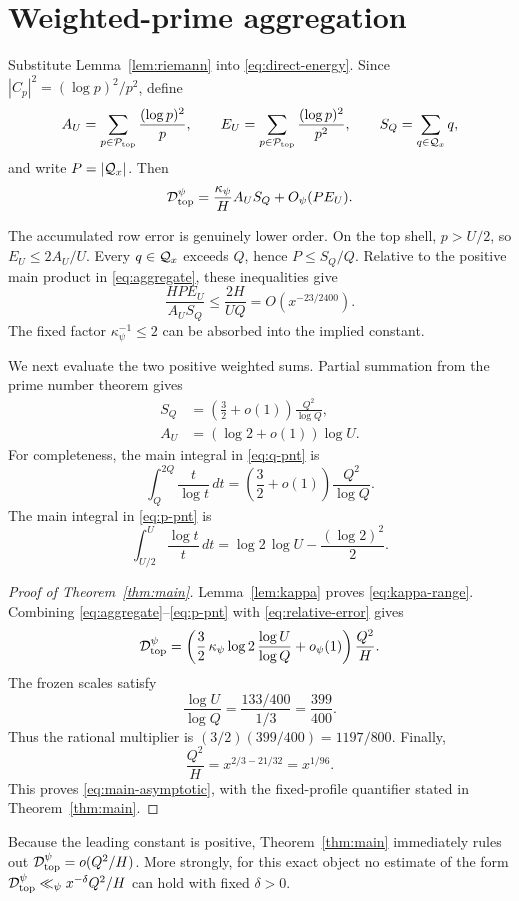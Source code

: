 \section{Weighted-prime aggregation}
\label{sec:aggregation}

Substitute Lemma~\ref{lem:riemann} into \eqref{eq:direct-energy}.  Since
$|C_p|^2=(\log p)^2/p^2$, define
\[
 A_U=\sum_{p\in\mathcal{P}_{\mathrm{top}}}\frac{(\log p)^2}{p},\qquad
 E_U=\sum_{p\in\mathcal{P}_{\mathrm{top}}}\frac{(\log p)^2}{p^2},\qquad
 S_Q=\sum_{q\in\mathcal{Q}_x}q,
\]
and write $P=|\mathcal{Q}_x|$.  Then
\begin{equation}
 \mathcal{D}_{\mathrm{top}}^{\psi}=\frac{\kappa_\psi}{H}A_US_Q+O_\psi(PE_U).
 \label{eq:aggregate}
\end{equation}

The accumulated row error is genuinely lower order.  On the top shell,
$p>U/2$, so $E_U\leq2A_U/U$.  Every $q\in\mathcal{Q}_x$ exceeds $Q$, hence
$P\leq S_Q/Q$.  Relative to the positive main product in
\eqref{eq:aggregate}, these inequalities give
\begin{equation}
 \frac{HPE_U}{A_US_Q}
 \leq\frac{2H}{UQ}
 =O\!\left(x^{-23/2400}\right).
 \label{eq:relative-error}
\end{equation}
The fixed factor $\kappa_\psi^{-1}\leq2$ can be absorbed into the implied
constant.

We next evaluate the two positive weighted sums.  Partial summation from the
prime number theorem gives \cite{MontgomeryVaughan2007}
\begin{align}
 S_Q&=\left(\frac32+o(1)\right)\frac{Q^2}{\log Q},
 \label{eq:q-pnt}\\
 A_U&=(\log2+o(1))\log U.
 \label{eq:p-pnt}
\end{align}
For completeness, the main integral in \eqref{eq:q-pnt} is
\[
 \int_Q^{2Q}\frac{t}{\log t}\,dt
 =\left(\frac32+o(1)\right)\frac{Q^2}{\log Q}.
\]
The main integral in \eqref{eq:p-pnt} is
\[
 \int_{U/2}^{U}\frac{\log t}{t}\,dt
 =\log2\,\log U-\frac{(\log2)^2}{2}.
\]

\begin{proof}[Proof of Theorem~\ref{thm:main}]
Lemma~\ref{lem:kappa} proves \eqref{eq:kappa-range}.  Combining
\eqref{eq:aggregate}--\eqref{eq:p-pnt} with
\eqref{eq:relative-error} gives
\[
 \mathcal{D}_{\mathrm{top}}^{\psi}=\left(
 \frac32\,\kappa_\psi\log2\,
 \frac{\log U}{\log Q}+o_\psi(1)\right)\frac{Q^2}{H}.
\]
The frozen scales satisfy
\[
 \frac{\log U}{\log Q}=\frac{133/400}{1/3}=\frac{399}{400}.
\]
Thus the rational multiplier is
$(3/2)(399/400)=1197/800$.  Finally,
\[
 \frac{Q^2}{H}=x^{2/3-21/32}=x^{1/96}.
\]
This proves \eqref{eq:main-asymptotic}, with the fixed-profile quantifier
stated in Theorem~\ref{thm:main}.
\end{proof}

Because the leading constant is positive, Theorem~\ref{thm:main} immediately
rules out $\mathcal{D}_{\mathrm{top}}^{\psi}=o(Q^2/H)$.  More strongly, for this exact object no estimate
of the form $\mathcal{D}_{\mathrm{top}}^{\psi}\ll_\psi x^{-\delta}Q^2/H$ can hold with fixed
$\delta>0$.
